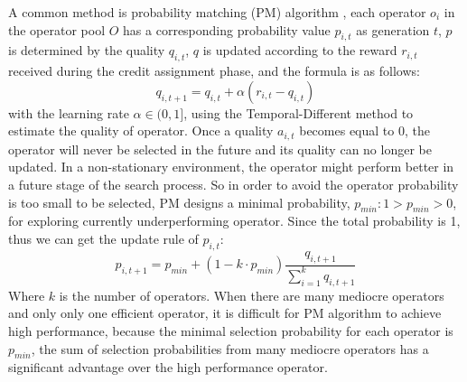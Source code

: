 \documentclass[journal]{IEEEtran}
\begin{document}
A common method is probability matching (PM) algorithm \cite{thierens2007adaptive}, each operator $o_i$ in the operator pool $O$ has a corresponding probability value $p_{i,t}$ as generation $t$, $p$ is determined by the quality $q_{i,t}$, $q$ is updated according to the reward $r_{i,t}$ received during the credit assignment phase, and the formula is as follows:
\begin{equation}
  q_{i,t+1} = q_{i,t} + \alpha(r_{i,t} - q_{i,t})
  \label{eq: pm_q}
\end{equation}
with the learning rate $\alpha \in (0,1]$, using the Temporal-Different method to estimate the quality of operator.
Once a quality $a_{i,t}$ becomes equal to 0, the operator will never be selected in the future and its quality can no longer be updated.
In a non-stationary environment, the operator might perform better in a future stage of the search process.
So in order to avoid the operator probability is too small to be selected, PM designs a minimal probability, $p_{min}: 1 > p_{min} > 0$, for exploring currently underperforming operator. Since the total probability is 1, thus we can get the update rule of $p_{i,t}$:
\begin{equation}
  p_{i,t+1} = p_{min} + (1-k \cdot p_{min}) \frac{q_{i,t+1}}{\sum_{i=1}^k q_{i,t+1}}
  \label{eq: pm_p}
\end{equation}
Where $k$ is the number of operators.
When there are many mediocre operators and only only one efficient operator, it is difficult for PM algorithm to achieve high performance, because the minimal selection probability for each operator is $p_{min}$, the sum of selection probabilities from many mediocre operators has a significant advantage over the high performance operator.
\end{document}
